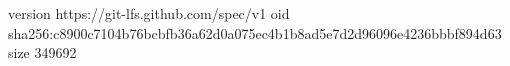 version https://git-lfs.github.com/spec/v1
oid sha256:c8900c7104b76bcbfb36a62d0a075ec4b1b8ad5e7d2d96096e4236bbbf894d63
size 349692
